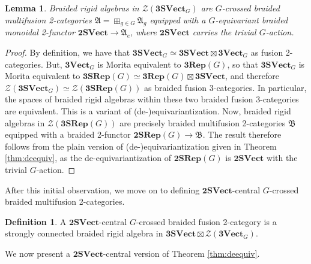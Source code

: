\documentclass[11pt,reqno]{amsart}
\newcommand{\tSVect}{\mathbf{2SVect}}
\newcommand{\cZ}{\mathcal{Z}}
\numberwithin{equation}{section}
\theoremstyle{plain}
\newtheorem{lem}[equation]{Lemma}
\theoremstyle{definition}
\newtheorem{defn}[equation]{Definition}
\begin{document}
\begin{lem}\label{lem:AlgInZ}
    Braided rigid algebras in $\cZ(\mathbf{3SVect}_G)$ are $G$-crossed braided multifusion 2-categories $\mathfrak{A} = \boxplus_{g\in G}\mathfrak{A}_g$ equipped with a $G$-equivariant braided monoidal 2-functor $\tSVect\rightarrow \mathfrak{A}_e$, where $\mathbf{2SVect}$ carries the trivial $G$-action.
\end{lem}
\begin{proof}
By definition, we have that $\mathbf{3SVect}_G\simeq \mathbf{3SVect}\boxtimes\mathbf{3Vect}_G$ as fusion 2-categories. But, $\mathbf{3Vect}_G$ is Morita equivalent to $\mathbf{3Rep}(G)$, so that $\mathbf{3SVect}_G$ is Morita equivalent to $\mathbf{3SRep}(G)\simeq \mathbf{3Rep}(G)\boxtimes \mathbf{3SVect}$, and therefore $\mathcal{Z}(\mathbf{3SVect}_G)\simeq \mathcal{Z}(\mathbf{3SRep}(G))$ as braided fusion 3-categories. In particular, the spaces of braided rigid algebras within these two braided fusion 3-categories are equivalent. This is a variant of (de-)equivariantization. Now, braided rigid algebras in $\mathcal{Z}(\mathbf{3SRep}(G))$ are precisely braided multifusion 2-categories $\mathfrak{B}$ equipped with a braided 2-functor $\mathbf{2SRep}(G)\rightarrow \mathfrak{B}$. The result therefore follows from the plain version of (de-)equivariantization given in Theorem \ref{thm:deequiv}, as the de-equivariantization of $\mathbf{2SRep}(G)$ is $\mathbf{2SVect}$ with the trivial $G$-action.
\end{proof}

After this initial observation, we move on to defining $\mathbf{2SVect}$-central $G$-crossed braided multifusion 2-categories.

\begin{defn}\label{def:enrichedGcrossed}
    A $\mathbf{2SVect}$-central $G$-crossed braided fusion 2-category is a strongly connected braided rigid algebra in $\mathbf{3SVect}\boxtimes \mathcal{Z}(\mathbf{3Vect}_G)$.
\end{defn}

We now present a $\mathbf{2SVect}$-central version of Theorem \ref{thm:deequiv}.
\end{document}

